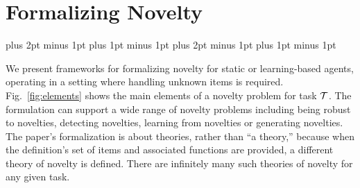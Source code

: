 \section{Formalizing Novelty} 

\abovedisplayskip=4pt plus 2pt minus 1pt 
\abovedisplayshortskip=2pt plus 1pt minus 1pt 
\belowdisplayskip=4pt plus 2pt minus 1pt 
\belowdisplayshortskip=2pt plus 1pt minus 1pt


We present frameworks for formalizing novelty for static or learning-based agents, operating in a setting where handling unknown items is required.  Fig.~\ref{fig:elements} shows the main elements of a novelty problem for task $\cal T$. 
 The formulation can support a wide range of novelty problems including being robust to novelties, detecting novelties, learning from novelties or generating novelties.   
 The paper's formalization is about theories, rather than ``a theory,'' because when the definition's set of items and associated functions are provided, a different theory of novelty is defined.  There are infinitely many such theories of novelty for any given task.






